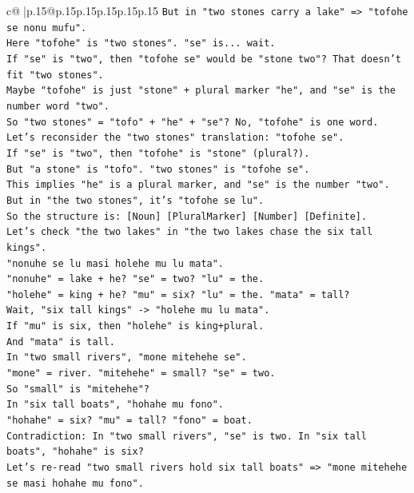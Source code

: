 \documentclass{article}
\begin{document}
{\begin{supertabular}{c@{$\;$}|p{.15\linewidth}@{}p{.15\linewidth}p{.15\linewidth}p{.15\linewidth}p{.15\linewidth}p{.15\linewidth}}
{{{\texttt{But in "two stones carry a lake" => "tofohe se nonu mufu".} \\
\texttt{Here "tofohe" is "two stones". "se" is... wait.} \\
\texttt{If "se" is "two", then "tofohe se" would be "stone two"? That doesn't fit "two stones".} \\
\texttt{Maybe "tofohe" is just "stone" + plural marker "he", and "se" is the number word "two".} \\
\texttt{So "two stones" = "tofo" + "he" + "se"? No, "tofohe" is one word.} \\
\texttt{Let's reconsider the "two stones" translation: "tofohe se".} \\
\texttt{If "se" is "two", then "tofohe" is "stone" (plural?).} \\
\texttt{But "a stone" is "tofo". "two stones" is "tofohe se".} \\
\texttt{This implies "he" is a plural marker, and "se" is the number "two".} \\
\texttt{But in "the two stones", it's "tofohe se lu".} \\
\texttt{So the structure is: {[}Noun{]} {[}PluralMarker{]} {[}Number{]} {[}Definite{]}.} \\
\texttt{Let's check "the two lakes" in "the two lakes chase the six tall kings".} \\
\texttt{"nonuhe se lu masi holehe mu lu mata".} \\
\texttt{"nonuhe" = lake + he? "se" = two? "lu" = the.} \\
\texttt{"holehe" = king + he? "mu" = six? "lu" = the. "mata" = tall?} \\
\texttt{Wait, "six tall kings" {-}> "holehe mu lu mata".} \\
\texttt{If "mu" is six, then "holehe" is king+plural.} \\
\texttt{And "mata" is tall.} \\
\texttt{In "two small rivers", "mone mitehehe se".} \\
\texttt{"mone" = river. "mitehehe" = small? "se" = two.} \\
\texttt{So "small" is "mitehehe"?} \\
\texttt{In "six tall boats", "hohahe mu fono".} \\
\texttt{"hohahe" = six? "mu" = tall? "fono" = boat.} \\
\texttt{Contradiction: In "two small rivers", "se" is two. In "six tall boats", "hohahe" is six?} \\
\texttt{Let's re{-}read "two small rivers hold six tall boats" => "mone mitehehe se masi hohahe mu fono".} \\
}}}
\end{supertabular}}
\end{document}
